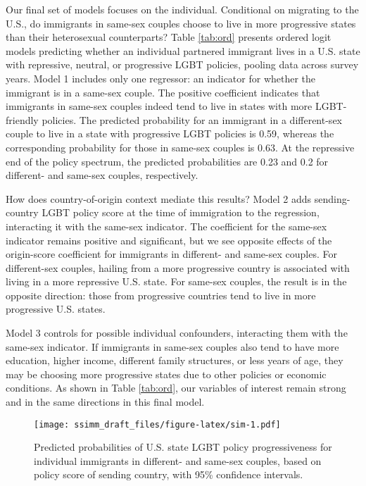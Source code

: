 \documentclass[
  11pt,
]{article}
\begin{document}
Our final set of models focuses on the individual. Conditional on migrating to the U.S., do immigrants in same-sex couples choose to live in more progressive states than their heterosexual counterparts? Table \ref{tab:ord} presents ordered logit models predicting whether an individual partnered immigrant lives in a U.S. state with repressive, neutral, or progressive LGBT policies, pooling data across survey years. Model 1 includes only one regressor: an indicator for whether the immigrant is in a same-sex couple. The positive coefficient indicates that immigrants in same-sex couples indeed tend to live in states with more LGBT-friendly policies. The predicted probability for an immigrant in a different-sex couple to live in a state with progressive LGBT policies is 0.59, whereas the corresponding probability for those in same-sex couples is 0.63. At the repressive end of the policy spectrum, the predicted probabilities are 0.23 and 0.2 for different- and same-sex couples, respectively.

How does country-of-origin context mediate this results? Model 2 adds sending-country LGBT policy score at the time of immigration to the regression, interacting it with the same-sex indicator. The coefficient for the same-sex indicator remains positive and significant, but we see opposite effects of the origin-score coefficient for immigrants in different- and same-sex couples. For different-sex couples, hailing from a more progressive country is associated with living in a more repressive U.S. state. For same-sex couples, the result is in the opposite direction: those from progressive countries tend to live in more progressive U.S. states.

Model 3 controls for possible individual confounders, interacting them with the same-sex indicator. If immigrants in same-sex couples also tend to have more education, higher income, different family structures, or less years of age, they may be choosing more progressive states due to other policies or economic conditions. As shown in Table \ref{tab:ord}, our variables of interest remain strong and in the same directions in this final model.

\begin{figure}
\centering
\texttt{[image: ssimm\_draft\_files/figure-latex/sim-1.pdf]}
\caption{\label{fig:sim}Predicted probabilities of U.S. state LGBT policy progressiveness for individual immigrants in different- and same-sex couples, based on policy score of sending country, with 95\% confidence intervals.}
\end{figure}
\end{document}

